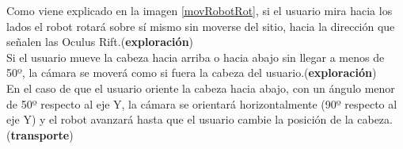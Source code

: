 \documentclass[twoside, 11pt]{epstfg}
\begin{document}
%



Como viene explicado en la imagen \ref{movRobotRot}, si el usuario mira hacia los lados el robot rotará sobre sí mismo sin moverse del sitio, hacia la dirección que señalen las Oculus Rift.(\textbf{exploración})\\
Si el usuario mueve la cabeza hacia arriba o hacia abajo sin llegar a menos de 50º, la cámara se moverá como si fuera la cabeza del usuario.(\textbf{exploración})\\
En el caso de que el usuario oriente la cabeza hacia abajo, con un ángulo menor de 50º respecto al eje Y, la cámara se orientará horizontalmente (90º respecto al eje Y) y el robot avanzará hasta que el usuario cambie la posición de la cabeza.(\textbf{transporte})
\end{document}
